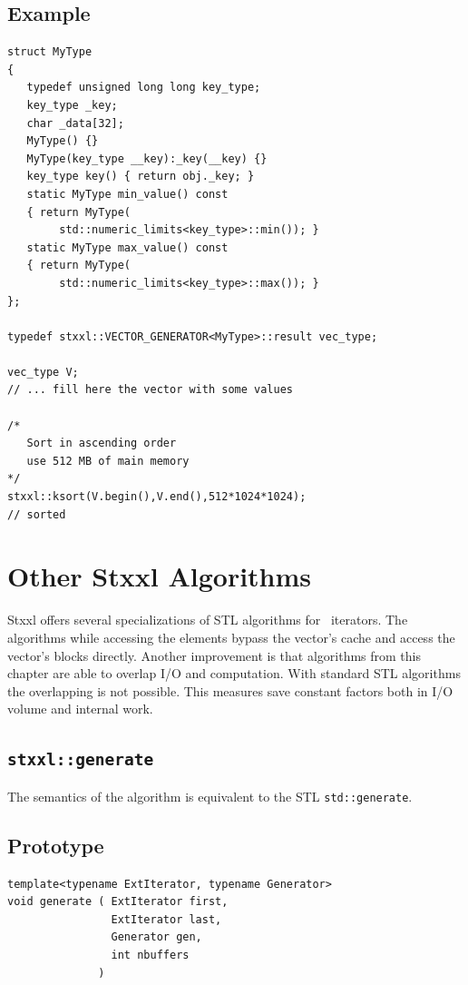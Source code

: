 \documentclass[twoside]{book}
\newcommand{\stxxl}{{\sc Stxxl} }
\begin{document}
\subsection*{Example}
\begin{lstlisting}
struct MyType
{
   typedef unsigned long long key_type;
   key_type _key;
   char _data[32];
   MyType() {}
   MyType(key_type __key):_key(__key) {}
   key_type key() { return obj._key; }
   static MyType min_value() const 
   { return MyType(
        std::numeric_limits<key_type>::min()); }
   static MyType max_value() const 
   { return MyType(
        std::numeric_limits<key_type>::max()); }
};

typedef stxxl::VECTOR_GENERATOR<MyType>::result vec_type;

vec_type V;
// ... fill here the vector with some values

/*
   Sort in ascending order
   use 512 MB of main memory
*/
stxxl::ksort(V.begin(),V.end(),512*1024*1024);
// sorted
\end{lstlisting}



\section{Other \stxxl Algorithms}
\label{otheralgs}

\stxxl offers several specializations of STL algorithms for \xvector\ 
iterators. The algorithms while accessing the elements bypass the
vector's cache and access the vector's blocks directly. Another
improvement is that algorithms from this chapter are able to overlap
I/O and computation. With standard STL algorithms the overlapping is
not possible. 
This measures save constant factors both in I/O volume and internal
work. 
\subsection{\texttt{stxxl::generate}}
\label{generate}
The semantics of the algorithm is equivalent to the STL
\texttt{std::generate}. 

\subsection*{Prototype}
\begin{lstlisting}
template<typename ExtIterator, typename Generator>
void generate ( ExtIterator first,
                ExtIterator last,
                Generator gen,
                int nbuffers
              ) 
\end{lstlisting}
\end{document}
